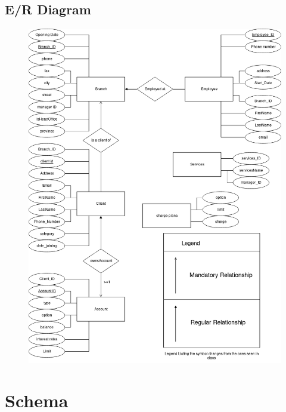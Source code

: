\documentclass[letterpaper, 12pt]{article}
\begin{document}
\newpage
\subsection{E/R Diagram}

\begin{figure}[H]
  \includegraphics[scale=0.55]{images/DB_WARMUP.png}
\end{figure}

\newpage
\section{Schema}
\end{document}

